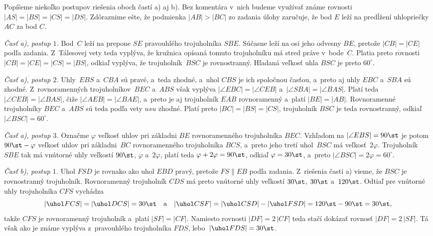 {%
\let\phi=\varphi
Popíšeme niekoľko postupov riešenia oboch častí a) aj b).
Bez komentára v~nich budeme využívať známe
rovnosti $|AS|=|BS|=|CS|=|DS|$. Zdôraznime ešte, že
podmienka $|AB|>|BC|$ zo zadania úlohy zaručuje,
že bod $E$ leží na predĺžení uhlopriečky~$AC$ za bod
$C$.

\smallskip\noindent
{\it Časť a), postup $1$.}
Bod~$C$ leží na prepone $SE$ pravouhlého trojuholníka $SBE$.
Súčasne leží na osi jeho odvesny $BE$, pretože $|CB|=|CE|$ podľa
zadania. Z~Tálesovej vety teda vyplýva, že kružnica opísaná tomuto
trojuholníku má stred práve v~bode~$C$. Platia preto rovnosti
$|CB|=|CE|=|CS|=|BS|$,
odkiaľ vyplýva, že trojuholník~$BSC$ je rovnostranný. Hľadaná veľkosť
uhla $BSC$ je preto $60^\circ$.

\smallskip\noindent
{\it Časť a), postup $2$.}
Uhly~$EBS$ a~$CBA$ sú pravé, a~teda zhodné, a~uhol $CBS$ je ich
spoločnou časťou, a~preto aj uhly $EBC$ a~$SBA$ sú zhodné.
Z~rovnoramenných trojuholníkov~$BEC$ a~$ABS$ však vyplýva
$|\angle EBC|=|\angle CEB|$ a~$|\angle SBA|=|\angle BAS|$.
Platí teda $|\angle CEB|=|\angle BAS|$, čiže
$|\angle AEB|=|\angle BAE|$, a~preto je aj trojuholník $EAB$
rovnoramenný a~platí $|BE|=|AB|$. Rovnoramenné trojuholníky $BEC$ a~$ABS$
sú teda podľa vety $usu$ zhodné. Platí preto $|BC|=|BS|=|CS|$,
trojuholník $BSC$ je teda rovnostranný, odkiaľ $|\angle BSC|=60^\circ$.

\smallskip\noindent
{\it Časť a), postup $3$.}
Označme $\phi$ veľkosť uhlov pri základni $BE$
rovnoramenného trojuholníka $BEC$. Vzhľadom na $|\angle EBS|=90\st$ je potom $90\st-\phi$ veľkosť uhlov pri základni~$BC$
rovnoramenného trojuholníka $BCS$, a~preto jeho tretí uhol~$BSC$
má veľkosť~$2\phi$. Trojuholník $SBE$ tak má vnútorné uhly
veľkostí $90\st$, $\phi$ a~$2\phi$, platí teda
$\phi+2\phi=90\st$, odkiaľ $\phi=30\st$,
a~preto $|\angle BSC|=2\phi=60^\circ$.
%

\smallskip\noindent
{\it Časť b), postup $1$.}
Uhol $FSD$ je rovnako ako uhol $EBD$
pravý, pretože $FS\parallel EB$ podľa zadania.
Z~riešenia časti a) vieme,
že $BSC$ je rovnostranný trojuholník. Rovnoramenný
trojuholník $CDS$ má preto vnútorné uhly veľkostí
$30\st$, $30\st$ a~$120\st$. Odtiaľ pre vnútorné uhly
trojuholníka $CFS$ vychádza
$$
|\uhol FCS|=|\uhol DCS|=30\st\quad\hbox{a}\quad
|\uhol CSF|=|\uhol CSD|-|\uhol FSD|=120\st-90\st=30\st,
$$
takže $CFS$ je rovnoramenný trojuholník a~platí $|SF|=|CF|$.
Namiesto rovnosti $|DF|=2\,|CF|$
teda stačí dokázať rovnosť $|DF|=2\,|SF|$.
Tá však ako je známe vyplýva z~pravouhlého trojuholníka $FDS$,
lebo~$|\uhol FDS|=30\st$.

}

